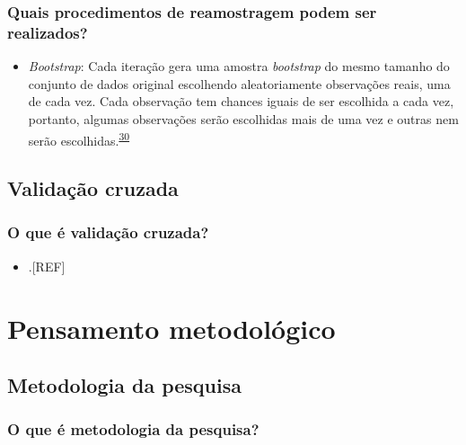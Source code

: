 \documentclass[
  a4paper,
]{book}
\providecommand{\tightlist}{%
  \setlength{\itemsep}{0pt}\setlength{\parskip}{0pt}}
\begin{document}
\hypertarget{quais-procedimentos-de-reamostragem-podem-ser-realizados}{%
\subsection{Quais procedimentos de reamostragem podem ser realizados?}\label{quais-procedimentos-de-reamostragem-podem-ser-realizados}}

\begin{itemize}
\tightlist
\item
  \emph{Bootstrap}: Cada iteração gera uma amostra \emph{bootstrap} do mesmo tamanho do conjunto de dados original escolhendo aleatoriamente observações reais, uma de cada vez. Cada observação tem chances iguais de ser escolhida a cada vez, portanto, algumas observações serão escolhidas mais de uma vez e outras nem serão escolhidas.\textsuperscript{\protect\hyperlink{ref-Bland2015}{30}}
\end{itemize}

\hypertarget{validauxe7uxe3o-cruzada}{%
\section{Validação cruzada}\label{validauxe7uxe3o-cruzada}}

\hypertarget{o-que-uxe9-validauxe7uxe3o-cruzada}{%
\subsection{O que é validação cruzada?}\label{o-que-uxe9-validauxe7uxe3o-cruzada}}

\begin{itemize}
\tightlist
\item
  .{[}REF{]}
\end{itemize}

\hypertarget{pensamento-metodologico}{%
\chapter{\texorpdfstring{\textbf{Pensamento metodológico}}{Pensamento metodológico}}\label{pensamento-metodologico}}

\hypertarget{metodologia-da-pesquisa}{%
\section{Metodologia da pesquisa}\label{metodologia-da-pesquisa}}

\hypertarget{o-que-uxe9-metodologia-da-pesquisa}{%
\subsection{O que é metodologia da pesquisa?}\label{o-que-uxe9-metodologia-da-pesquisa}}
\end{document}
